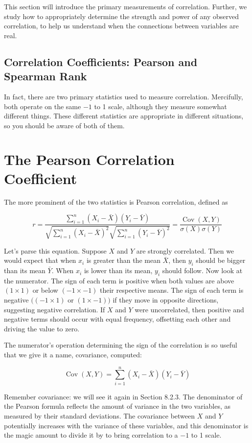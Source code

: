 \documentclass[10pt]{article}
\begin{document}
This section will introduce the primary measurements of correlation. Further, we study how to appropriately determine the strength and power of any observed correlation, to help us understand when the connections between variables are real.

\subsection{Correlation Coefficients: Pearson and Spearman Rank}
In fact, there are two primary statistics used to measure correlation. Mercifully, both operate on the same $-1$ to 1 scale, although they measure somewhat different things. These different statistics are appropriate in different situations, so you should be aware of both of them.

\section*{The Pearson Correlation Coefficient}
The more prominent of the two statistics is Pearson correlation, defined as

\[
r=\frac{\sum_{i=1}^{n}\left(X_{i}-\bar{X}\right)\left(Y_{i}-\bar{Y}\right)}{\sqrt{\sum_{i=1}^{n}\left(X_{i}-\bar{X}\right)^{2}} \sqrt{\sum_{i=1}^{n}\left(Y_{i}-\bar{Y}\right)^{2}}}=\frac{\operatorname{Cov}(X, Y)}{\sigma(X) \sigma(Y)}
\]

Let's parse this equation. Suppose $X$ and $Y$ are strongly correlated. Then we would expect that when $x_{i}$ is greater than the mean $\bar{X}$, then $y_{i}$ should be bigger than its mean $\bar{Y}$. When $x_{i}$ is lower than its mean, $y_{i}$ should follow. Now look at the numerator. The sign of each term is positive when both values are above $(1 \times 1)$ or below $(-1 \times -1)$ their respective means. The sign of each term is negative $((-1 \times 1)$ or $(1 \times -1))$ if they move in opposite directions, suggesting negative correlation. If $X$ and $Y$ were uncorrelated, then positive and negative terms should occur with equal frequency, offsetting each other and driving the value to zero.

The numerator's operation determining the sign of the correlation is so useful that we give it a name, covariance, computed:

\[
\operatorname{Cov}(X, Y)=\sum_{i=1}^{n}\left(X_{i}-\bar{X}\right)\left(Y_{i}-\bar{Y}\right)
\]

Remember covariance: we will see it again in Section 8.2.3. The denominator of the Pearson formula reflects the amount of variance in the two variables, as measured by their standard deviations. The covariance between $X$ and $Y$ potentially increases with the variance of these variables, and this denominator is the magic amount to divide it by to bring correlation to a $-1$ to 1 scale.
\end{document}
